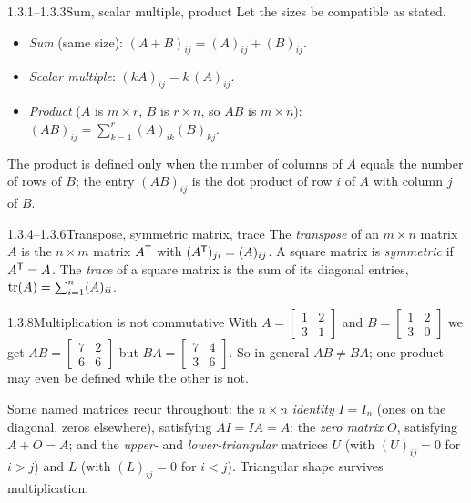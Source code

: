 \begin{defns}{1.3.1--1.3.3}{Sum, scalar multiple, product}
Let the sizes be compatible as stated.
\begin{itemize}[leftmargin=1.4em,itemsep=1pt]
\item \emph{Sum} (same size): $(A+B)_{ij}=(A)_{ij}+(B)_{ij}$.
\item \emph{Scalar multiple}: $(kA)_{ij}=k\,(A)_{ij}$.
\item \emph{Product} ($A$ is $m\times r$, $B$ is $r\times n$, so $AB$ is $m\times n$): $\displaystyle (AB)_{ij}=\sum_{k=1}^{r}(A)_{ik}(B)_{kj}$.
\end{itemize}
\end{defns}

The product is defined only when the number of columns of $A$ equals the number of rows of $B$; the entry $(AB)_{ij}$ is the dot product of row $i$ of $A$ with column $j$ of $B$.

\begin{defns}{1.3.4--1.3.6}{Transpose, symmetric matrix, trace}
The \emph{transpose} of an $m\times n$ matrix $A$ is the $n\times m$ matrix $A^{\mathsf{T}}$ with $(A^{\mathsf{T}})_{ji}=(A)_{ij}$. A square matrix is \emph{symmetric} if $A^{\mathsf{T}}=A$. The \emph{trace} of a square matrix is the sum of its diagonal entries, $\operatorname{tr}(A)=\sum_{i=1}^n (A)_{ii}$.
\end{defns}

\begin{exmp}{1.3.8}{Multiplication is not commutative}
With $A=\left[\begin{smallmatrix}1&2\\3&1\end{smallmatrix}\right]$ and $B=\left[\begin{smallmatrix}1&2\\3&0\end{smallmatrix}\right]$ we get $AB=\left[\begin{smallmatrix}7&2\\6&6\end{smallmatrix}\right]$ but $BA=\left[\begin{smallmatrix}7&4\\3&6\end{smallmatrix}\right]$. So in general $AB\neq BA$; one product may even be defined while the other is not.
\end{exmp}

Some named matrices recur throughout: the $n\times n$ \emph{identity} $I=I_n$ (ones on the diagonal, zeros elsewhere), satisfying $AI=IA=A$; the \emph{zero matrix} $O$, satisfying $A+O=A$; and the \emph{upper-} and \emph{lower-triangular} matrices $U$ (with $(U)_{ij}=0$ for $i>j$) and $L$ (with $(L)_{ij}=0$ for $i<j$). Triangular shape survives multiplication.

